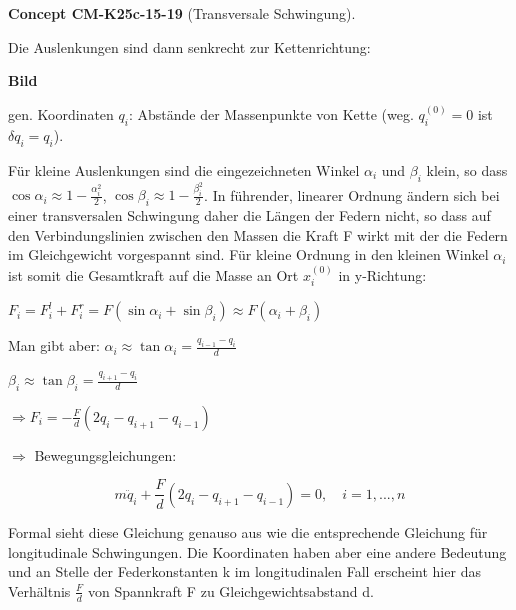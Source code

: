 \documentclass[10pt, letterpaper]{article}
\newcommand{\CustomHeading}[3]{%
  \par\medskip\noindent%
  \textbf{#1 #2} \textnormal{(#3)}.\enskip%
}
\newenvironment{CONC}[2]{\CustomHeading{Concept}{#1}{#2}}{}
\begin{document}
\begin{CONC}{CM-K25c-15-19}{Transversale Schwingung}
Die Auslenkungen sind dann senkrecht zur Kettenrichtung:

\textbf{Bild}

gen. Koordinaten $q_i$: Abstände der Massenpunkte von Kette
(weg. $q_i^{(0)} = 0$ ist $\delta q_i = q_i$).

Für kleine Auslenkungen sind die eingezeichneten Winkel $\alpha_i$ und
$\beta_i$ klein, so dass $\cos\alpha_i \approx 1- \frac{\alpha_i^2}{2}$, $\cos\beta_i \approx 1- \frac{\beta_i^2}{2}$.
In führender, linearer Ordnung ändern sich bei einer transversalen
Schwingung daher die Längen der Federn nicht, so dass auf
den Verbindungslinien zwischen den Massen die Kraft F wirkt
mit der die Federn im Gleichgewicht vorgespannt sind.
Für kleine Ordnung in den kleinen Winkel $\alpha_i$ ist somit die Gesamtkraft auf die Masse an Ort $x_i^{(0)}$ in y-Richtung:

$F_i = F_i^l + F_i^r = F(\sin \alpha_i + \sin \beta_i) \approx F(\alpha_i + \beta_i)$

Man gibt aber: $\alpha_i \approx \tan \alpha_i = \frac{q_{i-1}-q_i}{d}$

$\beta_i \approx \tan \beta_i = \frac{q_{i+1}-q_i}{d}$

$\Rightarrow F_i = -\frac{F}{d}(2q_i - q_{i+1} - q_{i-1})$

$\Rightarrow$ Bewegungsgleichungen:

\begin{equation}
m\ddot{q}_i + \frac{F}{d}(2q_i - q_{i+1} - q_{i-1}) = 0, \quad i=1,...,n
\end{equation}

Formal sieht diese Gleichung genauso aus wie die entsprechende Gleichung für longitudinale Schwingungen. Die Koordinaten haben aber eine andere Bedeutung und an Stelle der Federkonstanten k im longitudinalen Fall erscheint hier das Verhältnis $\frac{F}{d}$ von Spannkraft F zu Gleichgewichtsabstand d.
\end{CONC}
\end{document}
